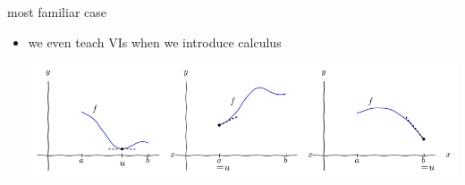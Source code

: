 \documentclass[svgnames,
               hyperref={colorlinks,citecolor=DeepPink4,linkcolor=FireBrick,urlcolor=Maroon},
               usepdftitle=false]  %
               {beamer}
\begin{document}
\begin{frame}{most familiar case}

\begin{itemize}
\item we even teach VIs when we introduce calculus

\includegraphics[width=\textwidth]{images/calcone.png}
\end{itemize}
\end{frame}
\end{document}
